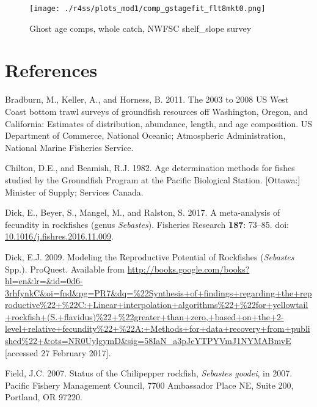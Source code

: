 \documentclass[12pt,]{article}
\begin{document}
\begin{figure}
\centering
\texttt{[image: ./r4ss/plots\_mod1/comp\_gstagefit\_flt8mkt0.png]}
\caption{Ghost age comps, whole catch, NWFSC shelf\_slope survey
\label{fig:age_fits}}
\end{figure}

\FloatBarrier
\newpage

\color{black}

\section{References}\label{references}

\renewcommand{\thepage}{}

\hypertarget{refs}{}
\hypertarget{ref-bradburn_2003_2011}{}
Bradburn, M., Keller, A., and Horness, B. 2011. The 2003 to 2008 US West
Coast bottom trawl surveys of groundfish resources off Washington,
Oregon, and California: Estimates of distribution, abundance, length,
and age composition. US Department of Commerce, National Oceanic;
Atmospheric Administration, National Marine Fisheries Service.

\hypertarget{ref-chilton_age_1982}{}
Chilton, D.E., and Beamish, R.J. 1982. Age determination methods for
fishes studied by the Groundfish Program at the Pacific Biological
Station. {[}Ottawa:{]} Minister of Supply; Services Canada.

\hypertarget{ref-dick_meta-analysis_2017}{}
Dick, E., Beyer, S., Mangel, M., and Ralston, S. 2017. A meta-analysis
of fecundity in rockfishes (genus \emph{Sebastes}). Fisheries Research
\textbf{187}: 73--85. doi:
\href{https://doi.org/10.1016/j.fishres.2016.11.009}{10.1016/j.fishres.2016.11.009}.

\hypertarget{ref-dick_modeling_2009}{}
Dick, E.J. 2009. Modeling the Reproductive Potential of Rockfishes
(\emph{Sebastes} Spp.). ProQuest. Available from
\url{http://books.google.com/books?hl=en\&lr=\&id=0d6-3rhfynkC\&oi=fnd\&pg=PR7\&dq=\%22Synthesis+of+findings+regarding+the+reproductive\%22+\%22C:+Linear+interpolation+algorithms\%22+\%22for+yellowtail+rockfish+(S.+flavidus)\%22+\%22greater+than+zero,+based+on+the+2-level+relative+fecundity\%22+\%22A:+Methods+for+data+recovery+from+published\%22+\&ots=NR0UylgymD\&sig=58IaN_a3pJeYTPYVmJ1NYMABmvE}
{[}accessed 27 February 2017{]}.

\hypertarget{ref-field_status_2007}{}
Field, J.C. 2007. Status of the Chilipepper rockfish, \emph{Sebastes
goodei}, in 2007. Pacific Fishery Management Council, 7700 Ambassador
Place NE, Suite 200, Portland, OR 97220.
\end{document}
